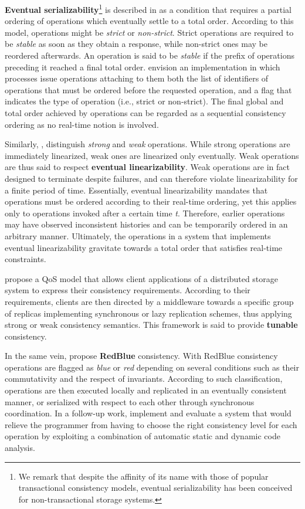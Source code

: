 \documentclass[letter, 11pt]{article}
\newcommand{\citeN}{\citet}
\renewcommand{\cite}{\citep}
\begin{document}
\textbf{Eventual serializability}\footnote{We remark that despite the affinity of its name with
those of popular transactional consistency models, eventual serializability 
has been conceived for non-transactional storage systems.}
is described in \cite{Fekete.Gupta.ea:96} as a condition that requires a partial ordering
of operations which eventually settle to a total order.
According to this model, operations might be \emph{strict} or \emph{non-strict}.
Strict operations are required to be \emph{stable} as soon as they obtain a response, while non-strict ones
may be reordered afterwards.
An operation is said to be \emph{stable} if the prefix of operations preceding it reached a final total order.
\citeN{Fekete.Gupta.ea:96} envision an implementation in which processes issue operations attaching to them both the list of 
identifiers of operations that must be ordered before the requested operation, and a flag that indicates the type of operation
(i.e., strict or non-strict).
The final global and total order achieved by operations can be regarded as a 
sequential consistency ordering as no real-time notion is involved. 

Similarly, \citeN{Serafini.Dobre.ea:10}, distinguish \emph{strong} and \emph{weak} operations.
While strong operations are immediately linearized, weak ones are linearized only eventually.
Weak operations are thus said to respect \textbf{eventual linearizability}.
Weak operations are in fact designed to terminate despite failures,
and can therefore violate linearizability for a finite period of time.
Essentially, eventual linearizability mandates that operations must be ordered 
according to their real-time ordering, yet this applies only to operations invoked after a certain time \emph{t}.
Therefore, earlier operations may have observed inconsistent histories 
and can be temporarily ordered in an arbitrary manner.
Ultimately, the operations in a system that implements eventual linearizability gravitate towards a 
total order that satisfies real-time constraints.

\citeN{Krishnamurthy.Sanders.ea:02}
propose a QoS model that allows client applications of a distributed storage system
to express their consistency requirements. 
According to their requirements, clients are then directed by a middleware towards a 
specific group of replicas implementing synchronous or lazy replication schemes, 
thus applying strong or weak consistency semantics.
This framework is said to provide \textbf{tunable} consistency.

In the same vein, \citeN{Li.Porto.ea:12} propose \textbf{RedBlue} consistency. 
With RedBlue consistency operations are flagged as \emph{blue} or \emph{red}
depending on several conditions such as their commutativity and the respect of invariants.
According to such classification, operations are then 
executed locally and replicated in an eventually consistent manner, 
or serialized with respect to each other through synchronous coordination.
In a follow-up work, \citeN{Li.ea:14} implement and evaluate a system that
would relieve the programmer
from having to choose the right consistency level for each operation
by exploiting a combination of automatic static and dynamic code analysis.
\end{document}
